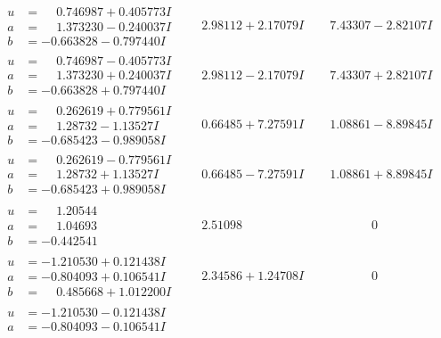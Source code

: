 \documentclass[1p]{elsarticle_modified}
\theoremstyle{definition}
\begin{document}
$$\begin{array}{c|c|c}
\begin{aligned}
u &= \phantom{-}0.746987 + 0.405773 I \\
a &= \phantom{-}1.373230 - 0.240037 I \\
b &= -0.663828 - 0.797440 I\end{aligned}
 & \phantom{-}2.98112 + 2.17079 I & \phantom{-}7.43307 - 2.82107 I \\ \hline\begin{aligned}
u &= \phantom{-}0.746987 - 0.405773 I \\
a &= \phantom{-}1.373230 + 0.240037 I \\
b &= -0.663828 + 0.797440 I\end{aligned}
 & \phantom{-}2.98112 - 2.17079 I & \phantom{-}7.43307 + 2.82107 I \\ \hline\begin{aligned}
u &= \phantom{-}0.262619 + 0.779561 I \\
a &= \phantom{-}1.28732 - 1.13527 I \\
b &= -0.685423 - 0.989058 I\end{aligned}
 & \phantom{-}0.66485 + 7.27591 I & \phantom{-}1.08861 - 8.89845 I \\ \hline\begin{aligned}
u &= \phantom{-}0.262619 - 0.779561 I \\
a &= \phantom{-}1.28732 + 1.13527 I \\
b &= -0.685423 + 0.989058 I\end{aligned}
 & \phantom{-}0.66485 - 7.27591 I & \phantom{-}1.08861 + 8.89845 I \\ \hline\begin{aligned}
u &= \phantom{-}1.20544\phantom{ +0.000000I} \\
a &= \phantom{-}1.04693\phantom{ +0.000000I} \\
b &= -0.442541\phantom{ +0.000000I}\end{aligned}
 & \phantom{-}2.51098\phantom{ +0.000000I} & \phantom{-0.000000 } 0 \\ \hline\begin{aligned}
u &= -1.210530 + 0.121438 I \\
a &= -0.804093 + 0.106541 I \\
b &= \phantom{-}0.485668 + 1.012200 I\end{aligned}
 & \phantom{-}2.34586 + 1.24708 I & \phantom{-0.000000 } 0 \\ \hline\begin{aligned}
u &= -1.210530 - 0.121438 I \\
a &= -0.804093 - 0.106541 I \\

\end{aligned}
\end{array}$$
\end{document}
